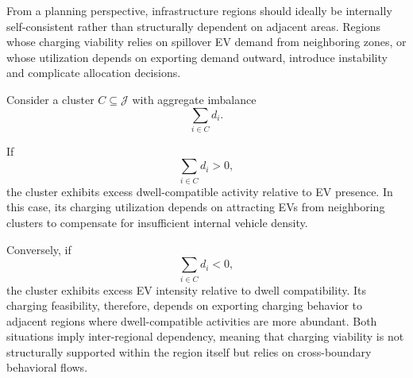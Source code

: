 \documentclass[conference]{IEEEtran}
\begin{document}
From a planning perspective, infrastructure regions should ideally be
internally self-consistent rather than structurally dependent on adjacent
areas. Regions whose charging viability relies on spillover EV demand
from neighboring zones, or whose utilization depends on exporting demand
outward, introduce instability and complicate allocation decisions.

Consider a cluster $C \subseteq \mathcal{J}$ with aggregate imbalance
\begin{equation}
\sum_{i\in C} d_i.
\end{equation}

If
\begin{equation}
\sum_{i\in C} d_i > 0,
\end{equation} 
the cluster exhibits excess dwell-compatible activity relative to EV
presence. In this case, its charging utilization depends on attracting
EVs from neighboring clusters to compensate for insufficient internal vehicle density.

Conversely, if
\begin{equation}
\sum_{i\in C} d_i < 0,
\end{equation}
the cluster exhibits excess EV intensity relative to dwell compatibility. Its charging feasibility, therefore, depends on exporting
charging behavior to adjacent regions where dwell-compatible activities are more abundant.
Both situations imply inter-regional dependency, meaning that charging
viability is not structurally supported within the region itself but relies on cross-boundary behavioral flows.
\end{document}
